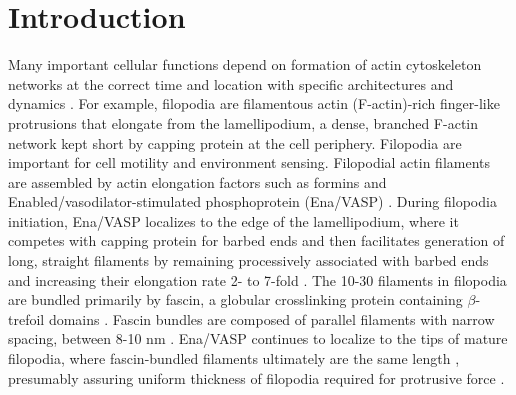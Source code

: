 \section{Introduction}\label{ch02-introduction}
Many important cellular functions depend on formation of actin cytoskeleton networks at the correct time and location with specific architectures and dynamics \citep{pollard_actin_2009,campellone_nucleator_2010}. For example, filopodia are filamentous actin (F-actin)-rich finger-like protrusions that elongate from the lamellipodium, a dense, branched F-actin network kept short by capping protein \citep{pollard_cellular_2003} at the cell periphery. Filopodia are important for cell motility and environment sensing. Filopodial actin filaments are assembled by actin elongation factors such as formins and Enabled/vasodilator-stimulated phosphoprotein (Ena/VASP) \citep{mattila_filopodia:_2008}. During filopodia initiation, Ena/VASP localizes to the edge of the lamellipodium, where it competes with capping protein for barbed ends \citep{bear_antagonism_2002, svitkina_mechanism_2003, barzik_ena/vasp_2005, applewhite_ena/vasp_2007, bear_ena/vasp:_2009, winkelman_ena/vasp_2014} and then facilitates generation of long, straight filaments by remaining processively associated with barbed ends and increasing their elongation rate 2- to 7-fold \citep{breitsprecher_clustering_2008,breitsprecher_molecular_2011,pasic_ena/vasp_2008,hansen_vasp_2010,winkelman_ena/vasp_2014,bruhmann_distinct_2017}. The 10-30 filaments in filopodia are bundled primarily by fascin, a globular crosslinking protein containing $\beta$-trefoil domains \citep{vignjevic_role_2006,jansen_mechanism_2011, mellor_role_2010}. Fascin bundles are composed of parallel filaments with narrow spacing, between 8-10 nm \citep{cant_drosophila_1994,edwards_fascins_1995,jansen_mechanism_2011,yang_molecular_2013}. Ena/VASP continues to localize to the tips of mature filopodia, where fascin-bundled filaments ultimately are the same length \citep{faix_making_2006,gupton_filopodia:_2007}, presumably assuring uniform thickness of filopodia required for protrusive force \citep{svitkina_mechanism_2003,winkelman_ena/vasp_2014}.

